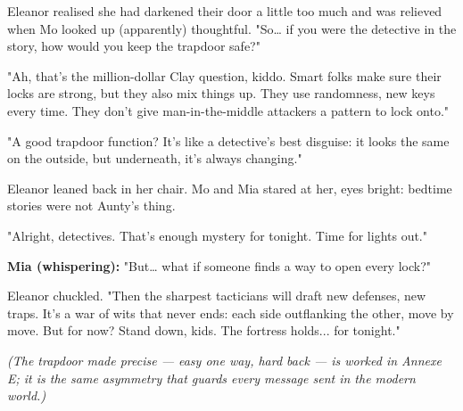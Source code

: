 \smallskip
Eleanor realised she had darkened their door a little too much and was relieved when Mo looked up (apparently) thoughtful. "So… if you were the detective in the story, how would you keep the trapdoor safe?"

"Ah, that’s the million-dollar Clay question, kiddo. Smart folks make sure their locks are strong, but they also mix things up. They use randomness, new keys every time. They don’t give man-in-the-middle attackers a pattern to lock onto."

"A good trapdoor function? It’s like a detective’s best disguise: it looks the same on the outside, but underneath, it’s always changing."

Eleanor leaned back in her chair. Mo and Mia stared at her, eyes bright: bedtime stories were not Aunty's thing.

"Alright, detectives. That’s enough mystery for tonight. Time for lights out."

\smallskip

\textbf{Mia (whispering):} "But… what if someone finds a way to open every lock?"

Eleanor chuckled. "Then the sharpest tacticians will draft new defenses, new traps. It’s a war of wits that never ends: each side outflanking the other, move by move. But for now? Stand down, kids. The fortress holds... for tonight."

\newpage
\textit{(The trapdoor made precise --- easy one way, hard back --- is worked in Annexe E; it is the same asymmetry that guards every message sent in the modern world.)}

